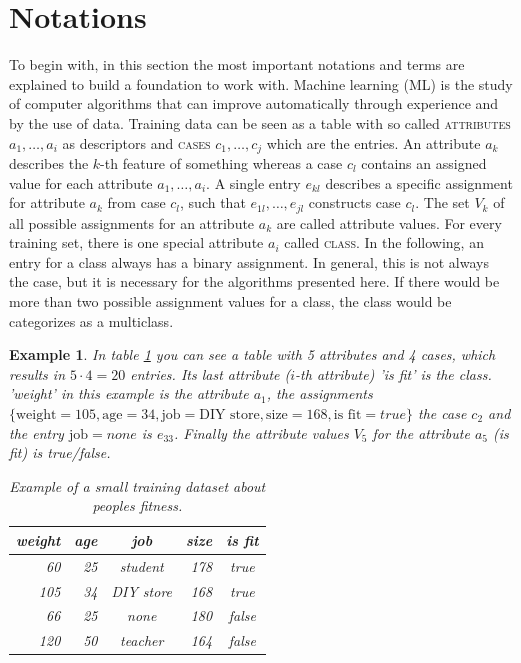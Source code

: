 \documentclass[a4paper,preprint]{sig-alternate-xt}
\newtheorem{exmp}{Example}[section]
\begin{document}
\section{Notations}
\label{sec:notations}
To begin with, in this section the most important notations and terms are explained to build a foundation to work with.
Machine learning (ML) is the study of computer algorithms that can improve automatically through experience and by the use of data. \cite{ML}
Training data can be seen as a table with so called \textsc{attributes} $a_1, \dots, a_i$ as descriptors and \textsc{cases} $c_1, \dots, c_j$ which are the entries.
An attribute $a_k$ describes the $k$-th feature of something whereas a case $c_l$ contains an assigned value for each attribute $a_1, \dots, a_i$. A single entry $e_{kl}$ describes a specific assignment for attribute $a_k$ from case $c_l$, such that $e_{1l}, \dots, e_{jl}$ constructs case $c_l$. The set $V_k$ of all possible assignments for an attribute $a_k$ are called attribute values.
For every training set, there is one special attribute $a_i$ called \textsc{class}.
In the following, an entry for a class always has a binary assignment.
In general, this is not always the case, but it is necessary for the algorithms presented here.
If there would be more than two possible assignment values for a class, the class would be categorizes as a multiclass.

\begin{exmp}
In table \ref{tab:training_data} you can see a table with 5 attributes and 4 cases, which results in $5\cdot4=20$ entries.
Its last attribute ($i$-th attribute) 'is fit' is the class. 'weight' in this example is the attribute $a_1$, the assignments $\{\text{weight}=105, \text{age}=34, \text{job}=\text{DIY store},\text{size}=168,\text{is fit}=true\}$ the case $c_2$ and the entry $\text{job}= none$ is $e_{33}$. Finally the attribute values $V_5$ for the attribute $a_5$ (is fit) is {true/false}.

\begin{table}[h]
\centering
\begin{tabular}{rrcr|c}
\multicolumn{1}{c}{weight} & \multicolumn{1}{c}{age} & job       & \multicolumn{1}{c|}{size} & is fit \\ \hline
60                         & 25                      & student   & 178                       & true   \\
105                        & 34                      & DIY store & 168                       & true   \\
66                         & 25                      & none      & 180                       & false  \\
120                        & 50                      & teacher   & 164                       & false 
\end{tabular}
\caption{Example of a small training dataset about peoples fitness.}
\label{tab:training_data}
\end{table}
\end{exmp}
\end{document}
